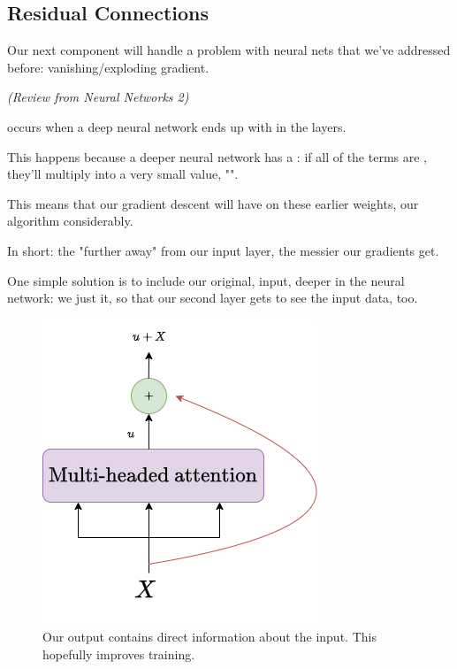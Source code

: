
    \pagebreak
    

    \subsection{Residual Connections}

    
        Our next component will handle a problem with  neural nets that we've addressed before: vanishing/exploding gradient.\\

        \begin{definition}
            \textit{(Review from Neural Networks 2)}
            
             occurs when a deep neural network ends up with  in the  layers. 
            
            This happens because a deeper neural network has a : if all of the terms are , they'll multiply into a very small value, "".
            
            This means that our gradient descent will have  on these earlier weights,  our algorithm considerably.
        \end{definition}

        In short: the "further away" from our input layer, the messier our gradients get.

        One simple solution is to include our original,  input, deeper in the neural network: we just  it, so that our second layer gets to see the input data, too.

        \begin{figure}[H]
            \centering
            \includegraphics[width=0.3\linewidth]{images/transformers_images/residual_connection.png}
            \caption*{Our output contains direct information about the input. This hopefully improves training.}
        \end{figure}

